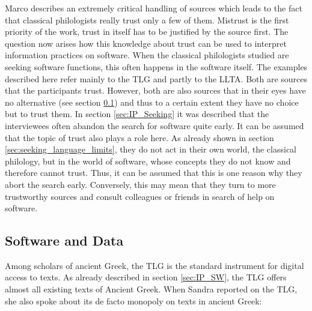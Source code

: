 \documentclass[12pt, a4paper, titlepage, oneside, abstract=true, toc=listof, toc=bibliography]{scrreprt}
\begin{document}
{%
Marco describes an extremely critical handling of sources which leads to the fact that classical philologists really trust only a few of them. Mistrust is the first priority of the work, trust in itself has to be justified by the source first. The question now arises how this knowledge about trust can be used to interpret information practices on software. 
When the classical philologists studied are seeking software functions, this often happens in the software itself. The examples described here refer mainly to the TLG and partly to the LLTA. Both are sources that the participants trust. However, both are also sources that in their eyes have no alternative (see section \ref{sec:SW_Data}) and thus to a certain extent they have no choice but to trust them.
In section \ref{sec:IP_Seeking} it was described that the interviewees often abandon the search for software quite early. It can be assumed that the topic of trust also plays a role here. As already shown in section \ref{sec:seeking_language_limits}, they do not act in their own world, the classical philology, but in the world of software, whose concepts they do not know and therefore cannot trust. Thus, it can be assumed that this is one reason why they abort the search early. Conversely, this may mean that they turn to more trustworthy sources and consult colleagues or friends in search of help on software.

\subsection{Software and Data}
\label{sec:SW_Data}
Among scholars of ancient Greek, the TLG is the standard instrument for digital access to texts. As already described in section \ref{sec:IP_SW}, the TLG offers almost all existing texts of Ancient Greek. When Sandra reported on the TLG, she also spoke about its de facto monopoly on texts in ancient Greek: 

}
\end{document}
